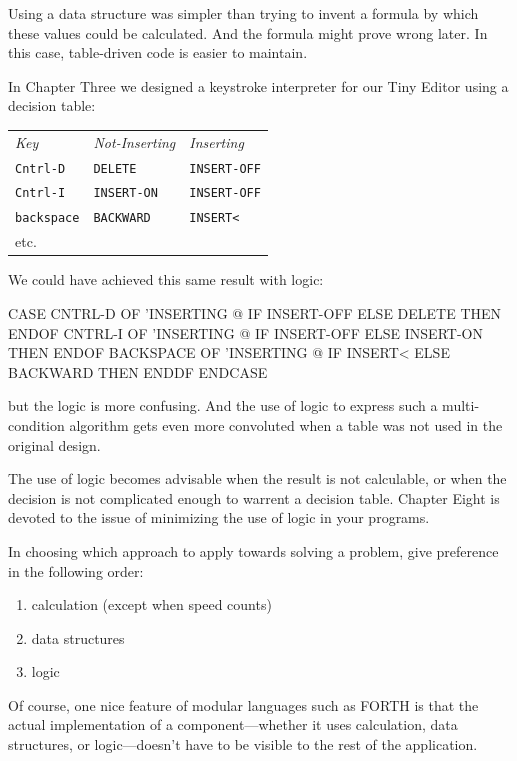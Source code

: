 Using a data structure was simpler than trying to invent a formula by
which these values could be calculated. And the formula might prove
wrong later. In this case, table-driven code is easier to maintain.

In Chapter Three we designed a keystroke interpreter for our Tiny
Editor using a decision table:

\begin{tabular}{lll}
\emph{Key}         & \emph{Not-Inserting} & \emph{Inserting} \\
\texttt{Cntrl-D}   & \texttt{DELETE}      & \texttt{INSERT-OFF} \\
\texttt{Cntrl-I}   & \texttt{INSERT-ON}   & \texttt{INSERT-OFF} \\
\texttt{backspace} & \texttt{BACKWARD}    & \texttt{INSERT<} \\
etc. & &
\end{tabular}

We could have achieved this same result with logic:

\begin{Code}
CASE
   CNTRL-D    OF  'INSERTING @  IF
      INSERT-OFF   ELSE DELETE     THEN   ENDOF
   CNTRL-I    OF  'INSERTING @  IF
      INSERT-OFF   ELSE INSERT-ON  THEN   ENDOF
   BACKSPACE  OF  'INSERTING @  IF
      INSERT<      ELSE BACKWARD   THEN   ENDDF
ENDCASE
\end{Code}
but the logic is more confusing. And the use of logic to express such a
multi-condition algorithm gets even more convoluted when a table was
not used in the original design.

The use of logic becomes advisable when the result is not calculable,
or when the decision is not complicated enough to warrent a decision
table. Chapter Eight is devoted to the issue of minimizing the use of logic
in your programs.

\begin{tip}
In choosing which approach to apply towards solving a problem, give
preference in the following order:

\begin{enumerate}
\item calculation (except when speed counts)
\item data structures
\item logic
\end{enumerate}
\end{tip}
Of course, one nice feature of modular languages such as FORTH is that
the actual implementation of a component---whether it uses calculation,
data structures, or logic---doesn't have to be visible to the rest of the
application.


